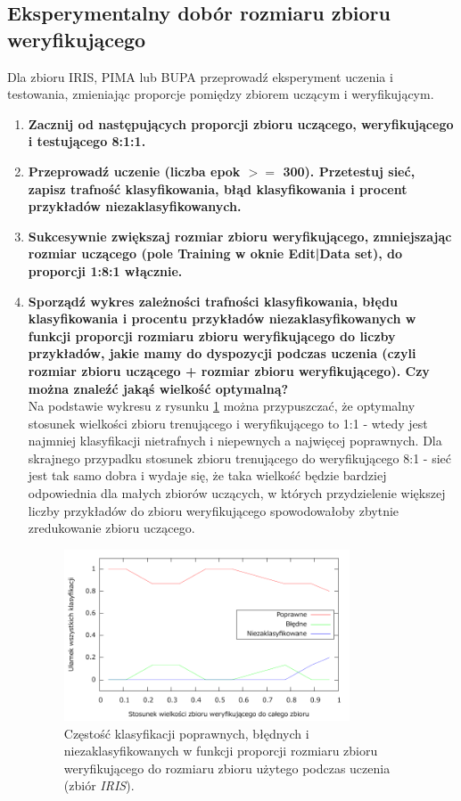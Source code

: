 \subsection{ Eksperymentalny dobór rozmiaru zbioru weryfikującego}
Dla zbioru IRIS, PIMA lub BUPA przeprowadź eksperyment uczenia i testowania, zmieniając proporcje pomiędzy zbiorem uczącym i weryfikującym.
\begin{enumerate}
\item \textbf{Zacznij od następujących proporcji zbioru uczącego, weryfikującego i testującego 8:1:1.}

\item \textbf{
Przeprowadź uczenie (liczba epok $ >= $ 300). Przetestuj sieć, zapisz trafność klasyfikowania, błąd klasyfikowania i procent przykładów niezaklasyfikowanych.}

\item \textbf{
Sukcesywnie zwiększaj rozmiar zbioru weryfikującego, zmniejszając rozmiar uczącego (pole Training w oknie Edit|Data set), do proporcji 1:8:1 włącznie.}

\item \textbf{
Sporządź wykres zależności trafności klasyfikowania, błędu klasyfikowania i procentu przykładów niezaklasyfikowanych w funkcji proporcji rozmiaru zbioru weryfikującego do liczby przykładów, jakie mamy do dyspozycji podczas uczenia (czyli rozmiar zbioru uczącego + rozmiar zbioru weryfikującego). Czy można znaleźć jakąś wielkość optymalną?
}
\\Na podstawie wykresu z rysunku \ref{fig:verify} można przypuszczać, że optymalny stosunek wielkości zbioru trenującego i weryfikującego to 1:1 - wtedy jest najmniej klasyfikacji nietrafnych i niepewnych a najwięcej  poprawnych. Dla skrajnego przypadku stosunek zbioru trenującego do weryfikującego 8:1 - sieć jest tak samo   dobra i wydaje się, że taka wielkość będzie bardziej odpowiednia dla małych zbiorów uczących, w których    przydzielenie większej liczby przykładów do zbioru weryfikującego spowodowałoby zbytnie zredukowanie zbioru     uczącego.

\begin{figure}[h]
\centering
\includegraphics[width=0.8\textwidth]{dane/part1/zad9/verify}
\caption{Częstość klasyfikacji poprawnych, błędnych i niezaklasyfikowanych w funkcji proporcji rozmiaru zbioru weryfikującego do rozmiaru zbioru użytego podczas uczenia (zbiór \emph {IRIS}).\label{fig:verify}}
\end{figure}


\end{enumerate}

